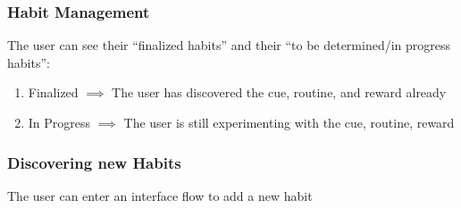 \subsubsection{Habit Management}
The user can see their “finalized habits” and their “to be determined/in progress habits”:

\begin{enumerate}
    \item Finalized $\implies$ The user has discovered the cue, routine, and reward already
    \item In Progress $\implies$ The user is still experimenting with the cue, routine, reward
\end{enumerate}
\subsubsection{Discovering new Habits}    
The user can enter an interface flow to add a new habit

